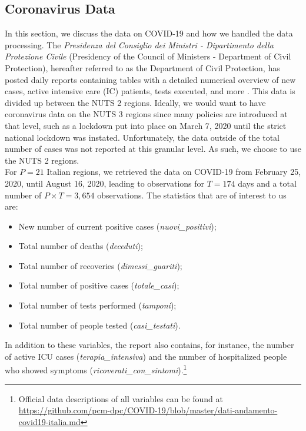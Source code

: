 \documentclass[12pt]{article}
\begin{document}
	\subsection{Coronavirus Data} \label{subsec:coronavirus_data}
	In this section, we discuss the data on COVID-19 and how we handled the data processing. The \textit{Presidenza del Consiglio dei Ministri - Dipartimento della Protezione Civile} (Presidency of the Council of Ministers - Department of Civil Protection), hereafter referred to as the Department of Civil Protection, has posted daily reports containing tables with a detailed numerical overview of new cases, active intensive care (IC) patients, tests executed, and more \parencite{Rosini2020Github}. This data is divided up between the NUTS 2 regions. Ideally, we would want to have coronavirus data on the NUTS 3 regions since many policies are introduced at that level, such as a lockdown put into place on March 7, 2020 until the strict national lockdown was instated. Unfortunately, the data outside of the total number of cases was not reported at this granular level. As such, we choose to use the NUTS 2 regions. \\
	
	For $P = 21$ Italian regions, we retrieved the data on COVID-19 from February 25, 2020, until August 16, 2020, leading to observations for $T = 174$ days and a total number of $P \times T = 3,654$ observations. The statistics that are of interest to us are:
	\begin{itemize}
	    \item New number of current positive cases (\textit{nuovi\_positivi});
	    \item Total number of deaths (\textit{deceduti});
	    \item Total number of recoveries (\textit{dimessi\_guariti});
	    \item Total number of positive cases (\textit{totale\_casi});
	    \item Total number of tests performed (\textit{tamponi});
	    \item Total number of people tested (\textit{casi\_testati}).
	\end{itemize}
	
	In addition to these variables, the report also contains, for instance, the number of active ICU cases (\textit{terapia\_intensiva}) and the number of hospitalized people who showed symptoms (\textit{ricoverati\_con\_sintomi}).\footnote{Official data descriptions of all variables can be found at \url{https://github.com/pcm-dpc/COVID-19/blob/master/dati-andamento-covid19-italia.md}} \\
	
\end{document}
